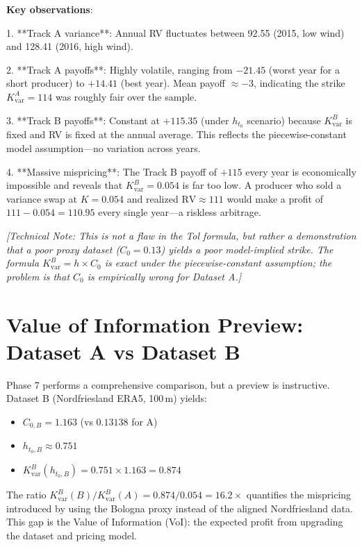 \documentclass[11pt, a4paper, twoside]{article}
\begin{document}
\textbf{Key observations}:

1. **Track A variance**: Annual RV fluctuates between 92.55 (2015, low wind) and 128.41 (2016, high wind).

2. **Track A payoffs**: Highly volatile, ranging from $-21.45$ (worst year for a short producer) to $+14.41$ (best year). Mean payoff $\approx -3$, indicating the strike $K_{\text{var}}^A = 114$ was roughly fair over the sample.

3. **Track B payoffs**: Constant at $+115.35$ (under $h_{t_0}$ scenario) because $K_{\text{var}}^B$ is fixed and RV is fixed at the annual average. This reflects the piecewise-constant model assumption---no variation across years.

4. **Massive mispricing**: The Track B payoff of $+115$ every year is economically impossible and reveals that $K_{\text{var}}^B = 0.054$ is far too low. A producer who sold a variance swap at $K = 0.054$ and realized $\text{RV} \approx 111$ would make a profit of $111 - 0.054 = 110.95$ every single year---a riskless arbitrage.

\textit{[Technical Note: This is not a flaw in the Tol formula, but rather a demonstration that a poor proxy dataset ($C_0 = 0.13$) yields a poor model-implied strike. The formula $K_{\text{var}}^B = h \times C_0$ is exact under the piecewise-constant assumption; the problem is that $C_0$ is empirically wrong for Dataset A.]}

\section{Value of Information Preview: Dataset A vs Dataset B}

Phase 7 performs a comprehensive comparison, but a preview is instructive. Dataset B (Nordfriesland ERA5, 100\,m) yields:
\begin{itemize}
\item $C_{0,B} = 1.163$ (vs $0.13138$ for A)
\item $h_{t_0, B} \approx 0.751$
\item $K_{\text{var}}^B(h_{t_0, B}) = 0.751 \times 1.163 = 0.874$
\end{itemize}

The ratio $K_{\text{var}}^B(B) / K_{\text{var}}^B(A) = 0.874 / 0.054 = 16.2×$ quantifies the mispricing introduced by using the Bologna proxy instead of the aligned Nordfriesland data. This gap is the Value of Information (VoI): the expected profit from upgrading the dataset and pricing model.
\end{document}
